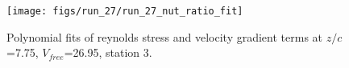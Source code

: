 \begin{figure}[H]
\centering
\texttt{[image: figs/run\_27/run\_27\_nut\_ratio\_fit]}
\caption{Polynomial fits of reynolds stress and velocity gradient terms at $z/c$=7.75, $V_{free}$=26.95, station 3.}
\label{fig:run_27_nut_ratio_fit}
\end{figure}


